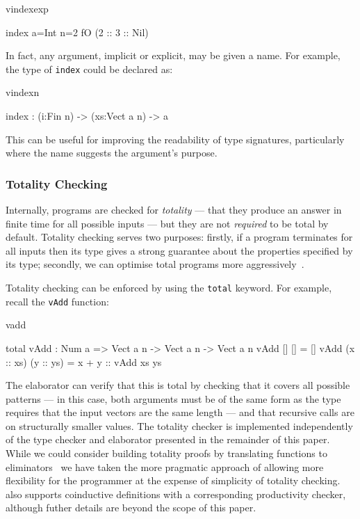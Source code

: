 \begin{SaveVerbatim}{vindexexp}

index {a=Int} {n=2} fO (2 :: 3 :: Nil)

\end{SaveVerbatim}

\noindent
In fact, any argument, implicit or explicit, may be given a name. For example,
the type of \texttt{index} could be declared as:

\begin{SaveVerbatim}{vindexn}

index : (i:Fin n) -> (xs:Vect a n) -> a

\end{SaveVerbatim}

\noindent
This can be useful for improving the readability of type signatures, particularly
where the name suggests the argument's purpose.

\subsubsection{Totality Checking}

Internally, \Idris{} programs are checked for \emph{totality} --- that they
produce an answer in finite time for all possible inputs --- but they are not
\emph{required} to be total by default. Totality checking serves two
purposes: firstly, if a program terminates for all inputs 
then its type gives a strong
guarantee about the properties specified by its type; secondly, we can
optimise total programs more aggressively~\cite{Brady2003}. 

Totality checking can be enforced by using the \texttt{total} keyword. For
example, recall the \texttt{vAdd} function:

\begin{SaveVerbatim}{vadd}

total vAdd : Num a => Vect a n -> Vect a n -> Vect a n
vAdd []        []        = []
vAdd (x :: xs) (y :: ys) = x + y :: vAdd xs ys

\end{SaveVerbatim}

\noindent
The elaborator can verify that this is total by checking that it covers all
possible patterns --- in this case, both arguments must be of the same form
as the type requires that the input vectors are the same length --- and that
recursive calls are on structurally smaller values. The totality checker is
implemented independently of the type checker and elaborator presented in the
remainder of this paper. While we could consider building totality proofs
by translating functions to eliminators~\cite{McBride2004a} we have taken
the more pragmatic approach of allowing more flexibility for the programmer
at the expense of simplicity of totality checking. \Idris{} also supports
coinductive definitions with a corresponding productivity checker, although
futher details are beyond the scope of this paper.

